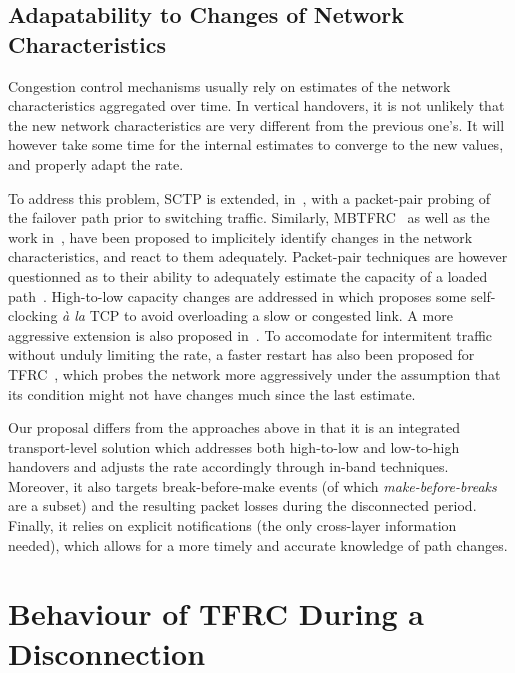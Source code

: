 \documentclass[twocolumn]{nictatechreport}
\begin{document}
\subsection{Adapatability to Changes of Network Characteristics}

Congestion control mechanisms usually rely on estimates of the network
characteristics aggregated over time. In vertical handovers, it is not unlikely
that the new network characteristics are very different from the previous one's.
It will however take some time for the internal estimates to converge to the new
values, and properly adapt the rate.

To address this problem, SCTP is extended,
in~\cite{2008shieh_sctp_vertical_handover}, with a packet-pair probing of the
failover path prior to switching traffic. Similarly,
MBTFRC~\cite{2006lin_mbtfrc} as well as the work
in~\cite{2006chen_link_capacity_tfrc_probe}, have been proposed to implicitely
identify changes in the network characteristics, and react to them adequately.
Packet-pair techniques are however questionned as to their ability to adequately
estimate the capacity of a loaded path~\cite{2001dovrolis_packet-pair}.
High-to-low capacity changes are addressed in
\cite{2001bansal_slowly_responsive_congestion_control} which proposes some
self-clocking \textit{à la} TCP to avoid overloading a slow or congested link. A
more aggressive extension is also proposed
in~\cite{2008li_improving_tfrc_bandwidth_handover}. To accomodate for
intermitent traffic without unduly limiting the rate, a faster restart has also
been proposed for TFRC~\cite{draft-ietf-dccp-tfrc-faster-restart-06}, which
probes the network more aggressively under the assumption that its condition
might not have changes much since the last estimate.

Our proposal differs from the approaches above in that it is an integrated
transport-level solution which addresses both high-to-low and low-to-high
handovers and adjusts the rate accordingly through in-band techniques. Moreover,
it also targets break-before-make events (of which \emph{make-before-breaks} are
a subset) and the resulting packet losses during the disconnected period.
Finally, it relies on explicit notifications (the only cross-layer information
needed), which allows for a more timely and accurate knowledge of path changes.

\section{Behaviour of TFRC During a Disconnection}
\label{freezetfrc:disconnection}
\end{document}
